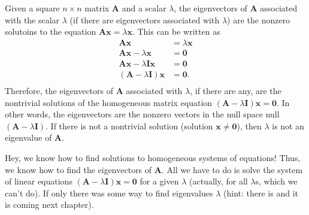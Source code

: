 \documentclass[
]{book}
\theoremstyle{definition}
\theoremstyle{definition}
\theoremstyle{definition}
\theoremstyle{definition}
\theoremstyle{remark}
\begin{document}
Given a square \(n \times n\) matrix \(\mathbf{A}\) and a scalar \(\lambda\), the eigenvectors of \(\mathbf{A}\) associated with the scalar \(\lambda\) (if there are eigenvectors associated with \(\lambda\)) are the nonzero solutoins to the equation \(\mathbf{A} \mathbf{x} = \lambda \mathbf{x}\). This can be written as
\[
\begin{aligned}
\mathbf{A} \mathbf{x} & = \lambda \mathbf{x} \\
\mathbf{A} \mathbf{x} -\lambda \mathbf{x} & = \mathbf{0} \\
\mathbf{A} \mathbf{x} -\lambda \mathbf{I} \mathbf{x} & = \mathbf{0} \\
\left( \mathbf{A} -\lambda \mathbf{I} \right) \mathbf{x} & = \mathbf{0}. \\
\end{aligned}
\]
Therefore, the eigenvectors of \(\mathbf{A}\) associated with \(\lambda\), if there are any, are the nontrivial solutions of the homogeneous matrix equation \(\left( \mathbf{A} - \lambda \mathbf{I} \right) \mathbf{x} = \mathbf{0}\). In other words, the eigenvectors are the nonzero vectors in the null space null\(\left( \mathbf{A} -\lambda \mathbf{I} \right)\). If there is not a nontrivial solution (solution \(\mathbf{x} \neq \mathbf{0}\)), then \(\lambda\) is not an eigenvalue of \(\mathbf{A}\).

Hey, we know how to find solutions to homogeneous systems of equations! Thus, we know how to find the eigenvectors of \(\mathbf{A}\). All we have to do is solve the system of linear equations \(\left( \mathbf{A} -\lambda \mathbf{I} \right) \mathbf{x} = \mathbf{0}\) for a given \(\lambda\) (actually, for all \(\lambda\)s, which we can't do). If only there was some way to find eigenvalues \(\lambda\) (hint: there is and it is coming next chapter).
\end{document}
